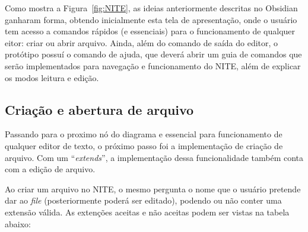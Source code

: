 Como mostra a Figura~\ref{fig:NITE}, as ideias anteriormente descritas no Obsidian ganharam forma, obtendo inicialmente esta tela de apresentação,
onde o usuário tem acesso a comandos rápidos (e essenciais) para o funcionamento de qualquer eitor: criar ou abrir arquivo.
Ainda, além do comando de saída do editor, o protótipo possuí o comando de ajuda, que deverá abrir um guia de comandos que serão
implementados para navegação e funcionamento do NITE, além de explicar os modos leitura e edição.

\subsection{Criação e abertura de arquivo}

Passando para o proximo nó do diagrama e essencial para funcionamento de qualquer editor de texto, o próximo passo foi a implementação
de criação de arquivo. Com um ``\textit{extends}'', a implementação dessa funcionalidade também conta com a edição de arquivo.

Ao criar um arquivo no NITE, o mesmo pergunta o nome que o usuário pretende dar ao \textit{file} (posteriormente poderá ser editado),
podendo ou não conter uma extensão válida. As extenções aceitas e não aceitas podem ser vistas na tabela abaixo:

